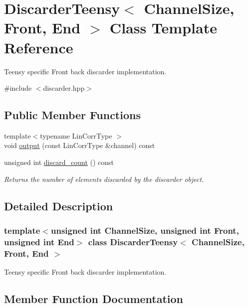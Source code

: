 \hypertarget{classDiscarderTeensy}{}\section{Discarder\+Teensy$<$ Channel\+Size, Front, End $>$ Class Template Reference}
\label{classDiscarderTeensy}


Teensy specific Front back discarder implementation.  




{\ttfamily \#include $<$discarder.\+hpp$>$}

\subsection*{Public Member Functions}
\begin{DoxyCompactItemize}
\item 
{\footnotesize template$<$typename Lin\+Corr\+Type $>$ }\\void \hyperlink{classDiscarderTeensy_a16d1489169e9cfae817c350604141826}{output} (const Lin\+Corr\+Type \&channel) const
\item 
unsigned int \hyperlink{classDiscarderTeensy_a8bf8936122ce65643c2079d2629aae9a}{discard\+\_\+count} () const
\begin{DoxyCompactList}\small\item\em Returns the number of elements discarded by the discarder object. \end{DoxyCompactList}\end{DoxyCompactItemize}


\subsection{Detailed Description}
\subsubsection*{template$<$unsigned int Channel\+Size, unsigned int Front, unsigned int End$>$\newline
class Discarder\+Teensy$<$ Channel\+Size, Front, End $>$}

Teensy specific Front back discarder implementation. 

\subsection{Member Function Documentation}
\mbox{\label{classDiscarderTeensy_a8bf8936122ce65643c2079d2629aae9a}} 
